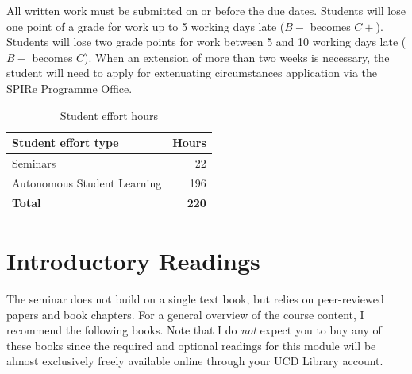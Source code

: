 \documentclass[abstract=on,parskip=full,headings=standardclasses,fontsize=11pt,paper=a4]{scrartcl}
\begin{document}
All written work must be submitted on or before the due dates. Students will lose one point of a grade for work up to 5 working days late ($B-$ becomes $C+$). Students will lose two grade points for work between 5 and 10 working days late ($B-$ becomes $C$). When an extension of more than two weeks is necessary, the student will need to apply for extenuating circumstances application via the SPIRe Programme Office.

\begin{table}[h] \centering \onehalfspacing
\caption*{Student effort hours}
\begin{tabular}{ l r} 
\toprule
Student effort type &  Hours \\
\midrule
Seminars & 22 \\
Autonomous Student Learning  & 196 \\
\textbf{Total} & \textbf{220} \\
\bottomrule
\end{tabular}
\end{table}



\section*{Introductory Readings}

The seminar does not build on a single text book, but relies  on peer-reviewed papers and book chapters. For  a general overview of the course content, I recommend the following books. Note that I do \textit{not} expect you to buy any of these books since the required and optional readings  for this module will be almost exclusively freely available online through your UCD Library account.
\end{document}
